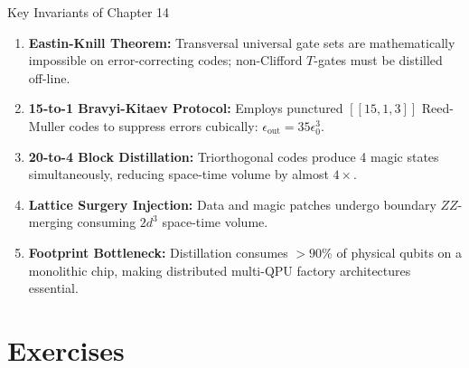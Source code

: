 
\begin{summarybox}{Key Invariants of Chapter 14}
\begin{enumerate}
    \item \textbf{Eastin-Knill Theorem:} Transversal universal gate sets are mathematically impossible on error-correcting codes; non-Clifford $T$-gates must be distilled off-line.
    \item \textbf{15-to-1 Bravyi-Kitaev Protocol:} Employs punctured $[[15,1,3]]$ Reed-Muller codes to suppress errors cubically: $\epsilon_{\text{out}} = 35\epsilon_0^3$.
    \item \textbf{20-to-4 Block Distillation:} Triorthogonal codes produce 4 magic states simultaneously, reducing space-time volume by almost $4\times$.
    \item \textbf{Lattice Surgery Injection:} Data and magic patches undergo boundary $ZZ$-merging consuming $2d^3$ space-time volume.
    \item \textbf{Footprint Bottleneck:} Distillation consumes $>90\%$ of physical qubits on a monolithic chip, making distributed multi-QPU factory architectures essential.
\end{enumerate}
\end{summarybox}


\section*{Exercises}

